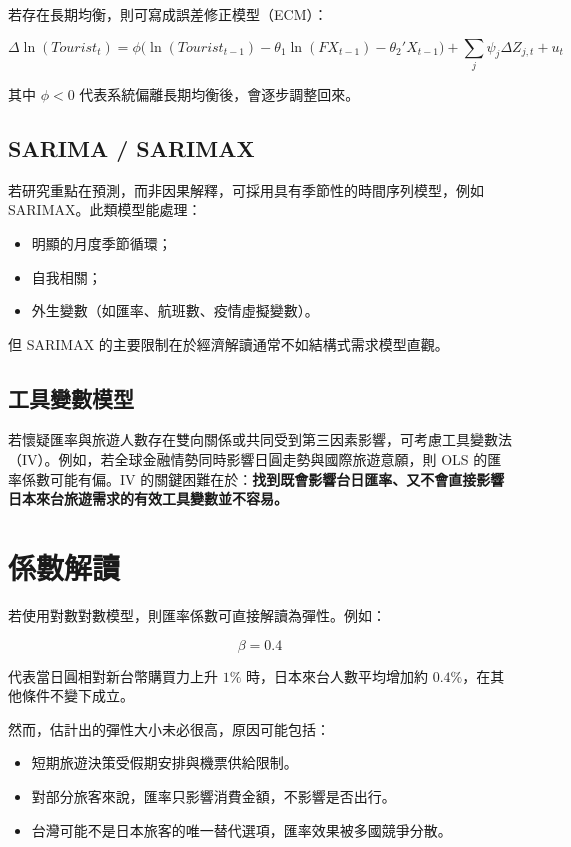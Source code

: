 \documentclass[12pt,a4paper,fontset=none]{ctexart}
\begin{document}
若存在長期均衡，則可寫成誤差修正模型（ECM）：

\begin{equation}
\Delta \ln(Tourist_t)
= \phi \Big(
\ln(Tourist_{t-1})
- \theta_1 \ln(FX_{t-1})
- \theta_2' X_{t-1}
\Big)
+ \sum_j \psi_j \Delta Z_{j,t}
+ u_t
\end{equation}

其中 $\phi < 0$ 代表系統偏離長期均衡後，會逐步調整回來。

\subsection{SARIMA / SARIMAX}

若研究重點在預測，而非因果解釋，可採用具有季節性的時間序列模型，例如 SARIMAX。此類模型能處理：

\begin{itemize}
  \item 明顯的月度季節循環；
  \item 自我相關；
  \item 外生變數（如匯率、航班數、疫情虛擬變數）。
\end{itemize}

但 SARIMAX 的主要限制在於經濟解讀通常不如結構式需求模型直觀。

\subsection{工具變數模型}

若懷疑匯率與旅遊人數存在雙向關係或共同受到第三因素影響，可考慮工具變數法（IV）。例如，若全球金融情勢同時影響日圓走勢與國際旅遊意願，則 OLS 的匯率係數可能有偏。IV 的關鍵困難在於：\textbf{找到既會影響台日匯率、又不會直接影響日本來台旅遊需求的有效工具變數並不容易。}

\section{係數解讀}

若使用對數對數模型，則匯率係數可直接解讀為彈性。例如：

\[
\beta = 0.4
\]

代表當日圓相對新台幣購買力上升 $1\%$ 時，日本來台人數平均增加約 $0.4\%$，在其他條件不變下成立。

然而，估計出的彈性大小未必很高，原因可能包括：

\begin{itemize}
  \item 短期旅遊決策受假期安排與機票供給限制。
  \item 對部分旅客來說，匯率只影響消費金額，不影響是否出行。
  \item 台灣可能不是日本旅客的唯一替代選項，匯率效果被多國競爭分散。
\end{itemize}
\end{document}
